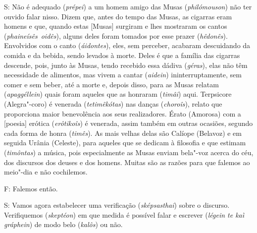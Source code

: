 S: Não é adequado (\emph{prépei}) a um homem amigo das Musas
(\emph{philómouson}) não ter ouvido falar nisso. Dizem que, antes do
tempo das Musas, as cigarras eram homens e que, quando estas [Musas]
surgiram e lhes mostraram os cantos (\emph{phaineísês}~\emph{oidês}),
alguns deles foram tomados por esse prazer (\emph{hêdonês}). Envolvidos
com o canto (\emph{áidontes}), eles, sem perceber, acabaram descuidando
da comida e da bebida, sendo levados à morte. Deles é que a família das
cigarras descende, pois, junto às Musas, tendo recebido essa dádiva
(\emph{géras}), elas não têm necessidade de alimentos, mas vivem a
cantar (\emph{aidein}) ininterruptamente, sem comer e sem beber, até a
morte e, depois disso, para as Musas relatam (\emph{apaggéllein}) quais
foram aqueles que as honraram (\emph{timâi}) aqui. Terpsicore
(Alegra"-coro) é venerada (\emph{tetimêkótas}) nas danças
(\emph{choroîs}), relato que proporciona maior benevolência aos seus
realizadores. \bekker{[259d]} Érato (Amorosa) com a [poesia] erótica
(\emph{erôtikoîs}) é venerada, assim também em outras ocasiões, segundo
cada forma de honra (\emph{timês}). As mais velhas delas são Calíope
(Belavoz) e em seguida Urânia (Celeste), para aqueles que se dedicam à
filosofia e que estimam (\emph{timôntas}) a música, pois especialmente
as Musas enviam bela"-voz acerca do céu, dos discursos dos deuses e dos
homens. Muitas são as razões para que falemos ao meio"-dia e não
cochilemos.

F: Falemos então.

\bekker{[259e]} S: Vamos agora estabelecer uma verificação
(\emph{sképsasthai}) sobre o discurso. Verifiquemos (\emph{skeptéon}) em
que medida é possível falar e escrever (\emph{légein te kaì gráphein})
de modo belo (\emph{kalôs}) ou não.

